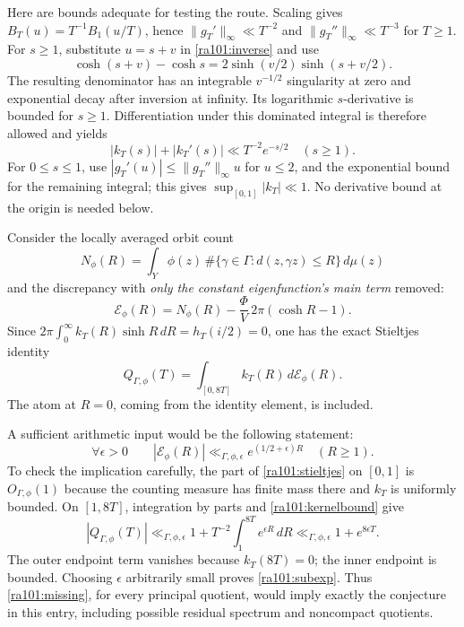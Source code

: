 \documentclass[11pt]{article}
\begin{document}
Here are bounds adequate for testing the route. Scaling gives
$B_T(u)=T^{-1}B_1(u/T)$, hence
$\|g_T'\|_\infty\ll T^{-2}$ and
$\|g_T''\|_\infty\ll T^{-3}$ for $T\ge1$.
For $s\ge1$, substitute $u=s+v$ in \eqref{ra101:inverse} and use
\[
 \cosh(s+v)-\cosh s
   =2\sinh(v/2)\sinh(s+v/2).
\]
The resulting denominator has an integrable $v^{-1/2}$ singularity at zero
and exponential decay after inversion at infinity. Its logarithmic
$s$-derivative is bounded for $s\ge1$. Differentiation under this dominated
integral is therefore allowed and yields
\begin{equation}\label{ra101:kernelbound}
 |k_T(s)|+|k_T'(s)|\ll T^{-2}e^{-s/2}\quad(s\ge1).
\end{equation}
For $0\le s\le1$, use
$|g_T'(u)|\le\|g_T''\|_\infty u$ for $u\le2$, and the exponential
bound for the remaining integral; this gives $\sup_{[0,1]}|k_T|\ll1$.
No derivative bound at the origin is needed below.

Consider the locally averaged orbit count
\[
 N_\phi(R)=\int_Y\phi(z)\,
          \#\{\gamma\in\Gamma:d(z,\gamma z)\le R\}\,d\mu(z)
\]
and the discrepancy with \emph{only the constant eigenfunction's main term}
removed:
\begin{equation}\label{ra101:error}
 \mathcal E_\phi(R)=N_\phi(R)
       -\frac{\Phi}{V}\,2\pi(\cosh R-1).
\end{equation}
Since
$2\pi\int_0^\infty k_T(R)\sinh R\,dR=h_T(i/2)=0$, one has the exact
Stieltjes identity
\begin{equation}\label{ra101:stieltjes}
 Q_{\Gamma,\phi}(T)=\int_{[0,8T]}k_T(R)\,d\mathcal E_\phi(R).
\end{equation}
The atom at $R=0$, coming from the identity element, is included.

A sufficient arithmetic input would be the following statement:
\begin{equation}\label{ra101:missing}
 \boxed{\quad
 \forall\epsilon>0\qquad
 |\mathcal E_\phi(R)|\ll_{\Gamma,\phi,\epsilon}
           e^{(1/2+\epsilon)R}\quad(R\ge1).
 \quad}
\end{equation}
To check the implication carefully, the part of
\eqref{ra101:stieltjes} on $[0,1]$ is $O_{\Gamma,\phi}(1)$ because the
counting measure has finite mass there and $k_T$ is uniformly bounded.
On $[1,8T]$, integration by parts and \eqref{ra101:kernelbound} give
\[
 |Q_{\Gamma,\phi}(T)|
 \ll_{\Gamma,\phi,\epsilon}
 1+T^{-2}\int_1^{8T}e^{\epsilon R}\,dR
 \ll_{\Gamma,\phi,\epsilon}1+e^{8\epsilon T}.
\]
The outer endpoint term vanishes because $k_T(8T)=0$; the inner endpoint is
bounded. Choosing $\epsilon$ arbitrarily small proves
\eqref{ra101:subexp}. Thus \eqref{ra101:missing}, for every principal quotient,
would imply exactly the conjecture in this entry, including possible residual
spectrum and noncompact quotients.
\end{document}
